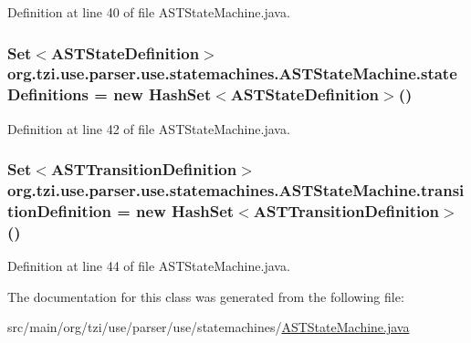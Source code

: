 Definition at line 40 of file A\-S\-T\-State\-Machine.\-java.

\hypertarget{classorg_1_1tzi_1_1use_1_1parser_1_1use_1_1statemachines_1_1_a_s_t_state_machine_a0d9ff396ea362ee872af4f82b5ea2b0b}{
\subsubsection[{state\-Definitions}]{\setlength{\rightskip}{0pt plus 5cm}Set$<${\bf A\-S\-T\-State\-Definition}$>$ org.\-tzi.\-use.\-parser.\-use.\-statemachines.\-A\-S\-T\-State\-Machine.\-state\-Definitions = new Hash\-Set$<${\bf A\-S\-T\-State\-Definition}$>$()\hspace{0.3cm}{\ttfamily [protected]}}}\label{classorg_1_1tzi_1_1use_1_1parser_1_1use_1_1statemachines_1_1_a_s_t_state_machine_a0d9ff396ea362ee872af4f82b5ea2b0b}


Definition at line 42 of file A\-S\-T\-State\-Machine.\-java.

\hypertarget{classorg_1_1tzi_1_1use_1_1parser_1_1use_1_1statemachines_1_1_a_s_t_state_machine_ae67e67db748f8c7f84567c4137299b1b}{
\subsubsection[{transition\-Definition}]{\setlength{\rightskip}{0pt plus 5cm}Set$<${\bf A\-S\-T\-Transition\-Definition}$>$ org.\-tzi.\-use.\-parser.\-use.\-statemachines.\-A\-S\-T\-State\-Machine.\-transition\-Definition = new Hash\-Set$<${\bf A\-S\-T\-Transition\-Definition}$>$()\hspace{0.3cm}{\ttfamily [protected]}}}\label{classorg_1_1tzi_1_1use_1_1parser_1_1use_1_1statemachines_1_1_a_s_t_state_machine_ae67e67db748f8c7f84567c4137299b1b}


Definition at line 44 of file A\-S\-T\-State\-Machine.\-java.



The documentation for this class was generated from the following file\-:\begin{DoxyCompactItemize}
\item 
src/main/org/tzi/use/parser/use/statemachines/\hyperlink{_a_s_t_state_machine_8java}{A\-S\-T\-State\-Machine.\-java}\end{DoxyCompactItemize}
